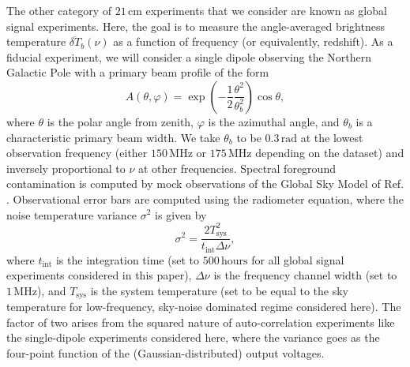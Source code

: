 \documentclass[twocolumn,aps,prd,nofootinbib,showpacs,superscriptaddress]{revtex4-1}
\begin{document}
The other category of $21\,\textrm{cm}$ experiments that we consider are known as global signal experiments. Here, the goal is to measure the angle-averaged brightness temperature $\overline{\delta T}_b(\nu)$ as a function of frequency (or equivalently, redshift). As a fiducial experiment, we will consider a single dipole observing the Northern Galactic Pole with a primary beam profile of the form
\begin{equation}
A(\theta, \varphi) = \exp \left( -\frac{1}{2} \frac{\theta^2}{\theta_b^2} \right) \cos \theta,
\end{equation}
where $\theta$ is the polar angle from zenith, $\varphi$ is the azimuthal angle, and $\theta_b$ is a characteristic primary beam width. We take $\theta_b$ to be $0.3\,\textrm{rad}$ at the lowest observation frequency (either $150\,\textrm{MHz}$ or $175\,\textrm{MHz}$ depending on the dataset) and inversely proportional to $\nu$ at other frequencies. Spectral foreground contamination is computed by mock observations of the Global Sky Model of Ref. \cite{deOliveiraCosta_et_al2008}. Observational error bars are computed using the radiometer equation, where the noise temperature variance $\sigma^2$ is given by
\begin{equation}
\sigma^2 = \frac{2 T_\textrm{sys}^2}{t_\textrm{int} \Delta \nu},
\end{equation}
where $t_\textrm{int}$ is the integration time (set to $500\,\textrm{hours}$ for all global signal experiments considered in this paper), $\Delta \nu$ is the frequency channel width (set to $1\,\textrm{MHz}$), and $T_\textrm{sys}$ is the system temperature (set to be equal to the sky temperature for low-frequency, sky-noise dominated regime considered here). The factor of two arises from the squared nature of auto-correlation experiments like the single-dipole experiments considered here, where the variance goes as the four-point function of the (Gaussian-distributed) output voltages.
\end{document}
